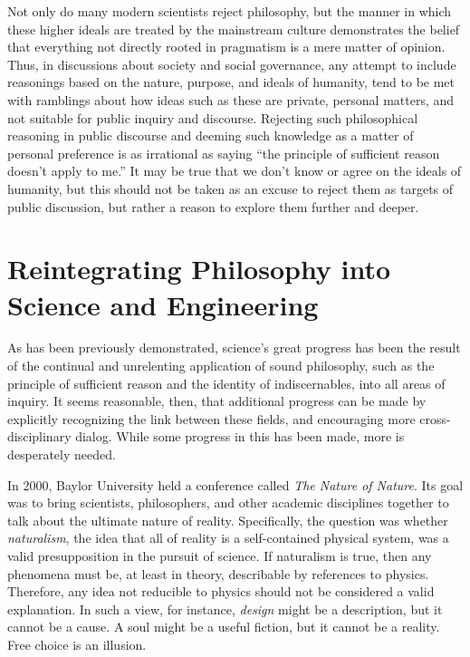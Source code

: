Not only do many modern scientists reject philosophy, but the manner in which these higher ideals are treated by the mainstream culture demonstrates the belief that everything not directly rooted in pragmatism is a mere matter of opinion.  
Thus, in discussions about society and social governance, any attempt to include reasonings based on the nature, purpose, and ideals of humanity, tend to be met with ramblings about how ideas such as these are private, personal matters, and not suitable for public inquiry and discourse.  Rejecting such philosophical reasoning in public discourse and deeming such knowledge as a matter of personal preference is as irrational as saying ``the principle of sufficient reason doesn't apply to me.''  It may be true that we don't know or agree on the ideals of humanity, but this should not be taken as an excuse to reject them as targets of public discussion, but rather a reason to explore them further and deeper.

\section{Reintegrating Philosophy into Science and Engineering}

As has been previously demonstrated, science's great progress has been the result of the continual and unrelenting application of sound philosophy, such as the principle of sufficient reason and the identity of indiscernables, into all areas of inquiry.  It seems reasonable, then, that additional progress can be made by explicitly recognizing the link between these fields, and encouraging more cross-disciplinary dialog.  While some progress in this has been made, more is desperately needed.

In 2000, Baylor University held a conference called \textit{The Nature of Nature}.  Its goal was to bring scientists, philosophers, and other academic disciplines together to talk about the ultimate nature of reality.  Specifically, the question was whether \textit{naturalism}, the idea that all of reality is a self-contained physical system, was a valid presupposition in the pursuit of science.\citep{gordondembski2011}  
If naturalism is true, then any phenomena must be, at least in theory, describable by references to physics.  Therefore, any idea not reducible to physics should not be considered a valid explanation.  In such a view, for instance, \textit{design} might be a description, but it cannot be a cause.  A soul might be a useful fiction, but it cannot be a reality.  Free choice is an illusion.  

